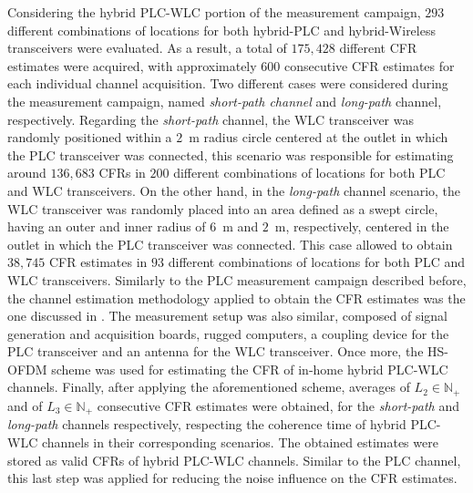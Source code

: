 Considering the hybrid \ac{PLC}-\ac{WLC} portion of the measurement campaign, $293$ different combinations of locations for both hybrid-\ac{PLC} and hybrid-Wireless transceivers were evaluated. As a result, a total of $175,428$ different \ac{CFR} estimates were acquired, with approximately $600$ consecutive \ac{CFR} estimates for each individual channel acquisition. Two different cases were considered during the measurement campaign, named \textit{short-path channel} and \textit{long-path} channel, respectively. Regarding the \textit{short-path} channel, the \ac{WLC} transceiver was randomly positioned within a $2$~m radius circle centered at the outlet in which the \ac{PLC} transceiver was connected, this scenario was responsible for estimating around $136,683$ \acp{CFR} in $200$ different combinations of locations for both \ac{PLC} and \ac{WLC} transceivers. On the other hand, in the \textit{long-path} channel scenario, the \ac{WLC} transceiver was randomly placed into an area defined as a swept circle, having an outer and inner radius of $6$~m and $2$~m, respectively, centered in the outlet in which the \ac{PLC} transceiver was connected. This case allowed to obtain $38,745$ \ac{CFR} estimates in $93$ different combinations of locations for both \ac{PLC} and \ac{WLC} transceivers. Similarly to the \ac{PLC} measurement campaign described before, the channel estimation methodology applied to obtain the \ac{CFR} estimates was the one discussed in \cite{Thiago:FR}. The measurement setup was also similar, composed of signal generation and acquisition boards, rugged computers, a coupling device \cite{Luis:AI} for the \ac{PLC} transceiver and an antenna for the \ac{WLC} transceiver. Once more, the \ac{HS-OFDM} scheme \cite{Moises:OFDM,Picorone} was used for estimating the \ac{CFR} of in-home hybrid \ac{PLC}-\ac{WLC} channels. Finally, after applying the aforementioned scheme, averages of $L_2 \in \mathbb{N}_+$ and of $L_3 \in \mathbb{N}_+$ consecutive \ac{CFR} estimates were obtained, for the \textit{short-path} and \textit{long-path} channels respectively, respecting the coherence time of hybrid \ac{PLC}-\ac{WLC} channels in their corresponding scenarios. The obtained estimates were stored as valid \acp{CFR} of hybrid \ac{PLC}-\ac{WLC} channels. Similar to the \ac{PLC} channel, this last step was applied for reducing the noise influence on the \ac{CFR} estimates. 

